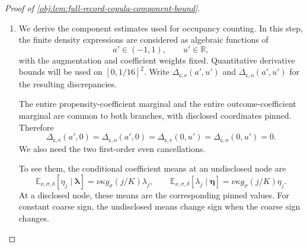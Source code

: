\begin{proof}[Proof of \cref{obj:lem:full-record-copula-component-bound}]
\begin{enumerate}
\[\begin{aligned}
 \bigl(1+\mathfrak o_{\mathsf c_*}\mathsf D_{\mathrm o}(\mathscr U)\bigr)\\
 &\le
 \exp\!\left(
 \mathsf T_{\mathrm o}(\mathscr U)
 +\mathfrak o_{\mathsf c_*}\mathsf D_{\mathrm o}(\mathscr U)\right).
\end{aligned}
\]
Applying this to each \(\mathscr C_j(\omega)\) proves
\[
1+\chi^2(P_1(\omega)\Vert Q(\omega))
 \le\exp(\mathcal B(\omega)).
\]
Finally, \(\mathsf f_0\) and \(\mathsf f_{\mathrm{av}}\) are strictly positive on the finite label alphabet. Hence
\[
Q(\omega)\ll P_0(\omega),
\qquad
P_1(\omega)\ll Q(\omega).
\]
All these comparisons are conditional on the full triple \(\omega\).

\item
We derive the component estimates used for occupancy counting. In this step, the finite density expressions are considered as algebraic functions of
\[
a'\in(-1,1),\qquad u'\in\mathbb R,
\]
with the augmentation and coefficient weights fixed. Quantitative derivative bounds will be used on
\([0,1/16]^2\). Write \(\Delta_{\mathsf c,\mathrm e}(a',u')\) and
\(\Delta_{\mathsf c,\mathrm o}(a',u')\) for the resulting discrepancies.

The entire propensity-coefficient marginal and the entire outcome-coefficient marginal are common to both branches, with disclosed coordinates pinned. Therefore
\[
\Delta_{\mathsf c,\mathrm e}(a',0)
 =\Delta_{\mathsf c,\mathrm o}(a',0)
 =\Delta_{\mathsf c,\mathrm e}(0,u')
 =\Delta_{\mathsf c,\mathrm o}(0,u')=0.
\]
We also need the two first-order even cancellations.

To see them, the conditional coefficient means at an undisclosed node are
\[
\mathbb E_{\nu,\sigma,\delta}
 [\eta_j\mid\boldsymbol\lambda]
 =\nu\kappa g_\sigma(j/K)\lambda_j,
\qquad
\mathbb E_{\nu,\sigma,\delta}
 [\lambda_j\mid\boldsymbol\eta]
 =\nu\kappa g_\sigma(j/K)\eta_j.
\]
At a disclosed node, these means are the corresponding pinned values. For constant coarse sign, the undisclosed means change sign when the coarse sign changes.


\end{enumerate}
\end{proof}
